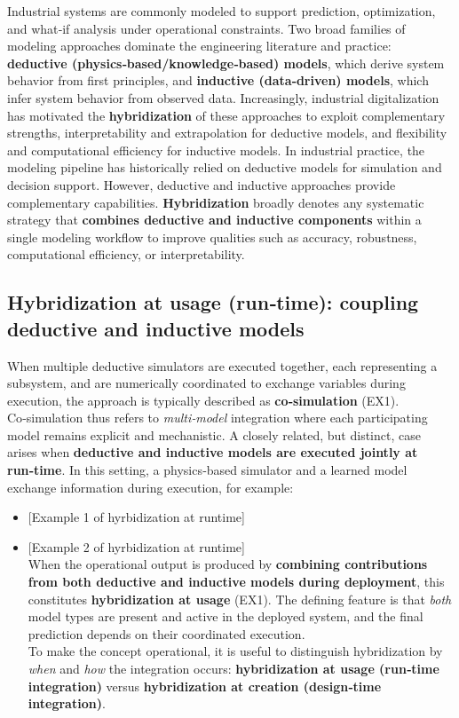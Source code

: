 \documentclass[
]{article}
\providecommand{\tightlist}{%
  \setlength{\itemsep}{0pt}\setlength{\parskip}{0pt}}
\begin{document}
Industrial systems are commonly modeled to support prediction,
optimization, and what‑if analysis under operational constraints. Two
broad families of modeling approaches dominate the engineering
literature and practice: \textbf{deductive
(physics‑based/knowledge‑based) models}, which derive system behavior
from first principles, and \textbf{inductive (data‑driven) models},
which infer system behavior from observed data. Increasingly, industrial
digitalization has motivated the \textbf{hybridization} of these
approaches to exploit complementary strengths, interpretability and
extrapolation for deductive models, and flexibility and computational
efficiency for inductive models. In industrial practice, the modeling
pipeline has historically relied on deductive models for simulation and
decision support. However, deductive and inductive approaches provide
complementary capabilities. \textbf{Hybridization} broadly denotes any
systematic strategy that \textbf{combines deductive and inductive
components} within a single modeling workflow to improve qualities such
as accuracy, robustness, computational efficiency, or interpretability.

\subsection{Hybridization at usage (run‑time): coupling deductive and
inductive
models}\label{hybridization-at-usage-runtime-coupling-deductive-and-inductive-models}

When multiple deductive simulators are executed together, each
representing a subsystem, and are numerically coordinated to exchange
variables during execution, the approach is typically described as
\textbf{co‑simulation} (EX1). Co‑simulation thus refers to
\emph{multi‑model} integration where each participating model remains
explicit and mechanistic. A closely related, but distinct, case arises
when \textbf{deductive and inductive models are executed jointly at
run‑time}. In this setting, a physics‑based simulator and a learned
model exchange information during execution, for example:

\begin{itemize}
\tightlist
\item
  {[}Example 1 of hyrbidization at runtime{]}
\item
  {[}Example 2 of hyrbidization at runtime{]}\\
  When the operational output is produced by \textbf{combining
  contributions from both deductive and inductive models during
  deployment}, this constitutes \textbf{hybridization at usage} (EX1).
  The defining feature is that \emph{both} model types are present and
  active in the deployed system, and the final prediction depends on
  their coordinated execution.\\
  To make the concept operational, it is useful to distinguish
  hybridization by \emph{when} and \emph{how} the integration occurs:
  \textbf{hybridization at usage (run‑time integration)} versus
  \textbf{hybridization at creation (design‑time integration)}.
\end{itemize}
\end{document}
